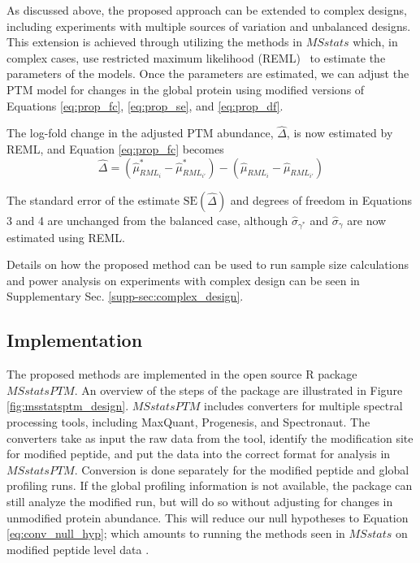 \documentclass[mcp]{article}
\numberwithin{table}{section}
\begin{document}
As discussed above, the proposed approach can be extended to complex designs, including experiments with multiple sources of variation and unbalanced designs. This extension is achieved through utilizing the methods in $MSstats$ which, in complex cases, use restricted maximum likelihood (REML)~\cite{Kenward} to estimate the parameters of the models. Once the parameters are estimated, we can adjust the PTM model for changes in the global protein using modified versions of Equations \ref{eq:prop_fc}, \ref{eq:prop_se}, and \ref{eq:prop_df}. 

The log-fold change in the adjusted PTM abundance, $\hat{\Delta
}$, is now estimated by REML, and Equation \ref{eq:prop_fc} becomes 
\begin{equation}
\hat{\Delta} = (\hat{\mu}_{RML_i}^{\ast} - \hat{\mu}_{RML_{i'}}^{\ast}) - (\hat{\mu}_{RML_i} - \hat{\mu}_{RML_{i'}})
\end{equation}

The standard error of the estimate $\mathrm{SE}(\hat{\Delta})$ and degrees of freedom in Equations 3 and 4 are unchanged from the balanced case, although $\hat{\sigma}_{\gamma^\ast}$ and $\hat{\sigma}_{\gamma}$ are now estimated using REML.

Details on how the proposed method can be used to run sample size calculations and power analysis on experiments with complex design can be seen in Supplementary Sec. \ref{supp-sec:complex_design}.

\subsection*{Implementation}

The proposed methods are implemented in the open source R package $MSstatsPTM$. An overview of the steps of the package are illustrated in Figure \ref{fig:msstatsptm_design}. $MSstatsPTM$ includes converters for multiple spectral processing tools, including MaxQuant, Progenesis, and Spectronaut. The converters take as input the raw data from the tool, identify the modification site for modified peptide, and put the data into the correct format for analysis in $MSstatsPTM$. Conversion is done separately for the modified peptide and global profiling runs. If the global profiling information is not available, the package can still analyze the modified run, but will do so without adjusting for changes in unmodified protein abundance. This will reduce our null hypotheses to Equation \ref{eq:conv_null_hyp}; which amounts to running the methods seen in $MSstats$ on modified peptide level data \cite{Choi:2014} \cite{Huang:2020}.
\end{document}
